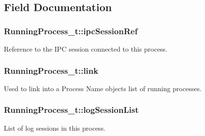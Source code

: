 \subsection{Field Documentation}
\subsubsection[{\texorpdfstring{ipc\+Session\+Ref}{ipcSessionRef}}]{ Running\+Process\+\_\+t\+::ipc\+Session\+Ref}\hypertarget{struct_running_process__t_aecf1049729d113bc5f8a68076d7f357c}{}\label{struct_running_process__t_aecf1049729d113bc5f8a68076d7f357c}


Reference to the I\+PC session connected to this process. 

\subsubsection[{\texorpdfstring{link}{link}}]{ Running\+Process\+\_\+t\+::link}\hypertarget{struct_running_process__t_af39d18d2d787b0348591a3a6f1b63da0}{}\label{struct_running_process__t_af39d18d2d787b0348591a3a6f1b63da0}
Used to link into a Process Name object\textquotesingle{}s list of running processes. 
\subsubsection[{\texorpdfstring{log\+Session\+List}{logSessionList}}]{ Running\+Process\+\_\+t\+::log\+Session\+List}\hypertarget{struct_running_process__t_a831478af4823c8cb1e08228edd5fc98b}{}\label{struct_running_process__t_a831478af4823c8cb1e08228edd5fc98b}


List of log sessions in this process. 

